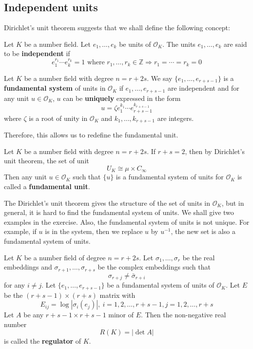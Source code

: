 \subsection{Independent units}

Dirichlet's unit theorem suggests that we shall define the following concept:

\begin{definition} Let $K$ be a number field. Let $e_1,\ldots,e_k$ be units of $\mathcal{O}_K$.
The units $e_1,\ldots,e_k$ are said to be {\bf independent} if
$$e^{r_1}_1\cdots e^{r_k}_k=1 \text{ where } r_1,\ldots,r_k \in \mathbb{Z} \Rightarrow r_1=\cdots=r_k=0$$
\end{definition}

\begin{definition} Let $K$ be a number field with degree $n=r+2s$. We say $\{e_1,\ldots,e_{r+s-1}\}$
is a {\bf fundamental system} of units in $\mathcal{O}_K$ if $e_1,\ldots,e_{r+s-1}$ are independent and
for any unit $u \in \mathcal{O}_K$, $u$ can be {\bf uniquely} expressed in the form
$$u=\zeta e^{k_1}_1\cdots e^{k_{r+s-1}}_{r+s-1}$$
where $\zeta$ is a root of unity in $\mathcal{O}_K$ and $k_1,\ldots,k_{r+s-1}$ are integers.
\end{definition}
Therefore, this allows us to redefine the fundamental unit.
\begin{definition} Let $K$ be a number field with degree $n=r+2s$. If $r+s=2$, then by Dirichlet's unit theorem, the set of unit
$$U_K \cong \mu \times C_\infty$$
Then any unit $u \in \mathcal{O}_K$ such that $\{u\}$ is a fundamental system of units for $\mathcal{O}_K$ is called a {\bf fundamental unit}.
\end{definition}
The Dirichlet's unit theorem gives the structure of the set of units in $\mathcal{O}_K$, but in general, it is hard to find the fundamental system of units. We shall give two examples in the exercise. Also, the fundamental system
of units is not unique. For example, if $u$ is in the system, then we replace $u$ by $u^{-1}$, the new set
is also a fundamental system of units.
\begin{definition} Let $K$ be a number field of degree $n=r+2s$. Let $\sigma_1,\ldots,\sigma_r$ be the real embeddings and $\sigma_{r+1},\ldots,\sigma_{r+s}$ be the complex embeddings such that
$$\sigma_{r+j} \neq \bar{\sigma}_{r+i}$$
for any $i \neq j$. Let $\{e_1,\ldots,e_{r+s-1}\}$ be a fundamental system of units of $\mathcal{O}_K$.
Let $E$ be the $(r+s-1) \times (r+s)$ matrix with
$$E_{ij}=\log{|\sigma_i(e_j)|},~i=1,2,\ldots,r+s-1,j=1,2,\ldots,r+s$$
Let $A$ be any $r+s-1 \times r+s-1$ minor of $E$. Then the non-negative real number
$$R(K)=|\det{A}|$$
is called the {\bf regulator} of $K$.
\end{definition}
